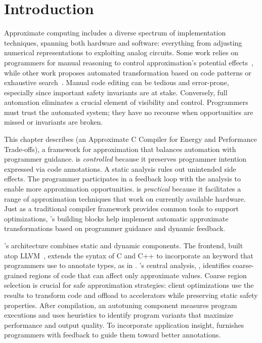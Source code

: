 \section{Introduction}\label{accept:sec:intro}

Approximate computing includes a diverse spectrum of
implementation techniques, spanning both hardware and software:
everything from adjusting numerical representations
to exploiting analog circuits.
Some work relies on programmers for manual reasoning to control
approximation's
potential effects~\cite{npu, flikker, races-ibm, perforation},
while other work proposes automated transformation based on code
patterns or exhaustive search~\cite{green, paraprox, sage}.
Manual code editing can be tedious and error-prone, especially since
important safety invariants are at stake.
Conversely, full automation eliminates a crucial element of
visibility and control.
Programmers must trust the automated system; they have no recourse when
opportunities are missed or invariants are broken.

This chapter describes \sysname
(an Approximate C Compiler for Energy and Performance Trade-offs),
a framework for approximation that balances automation with programmer
guidance.
\sysname is \emph{controlled} because it preserves programmer intention
expressed via code annotations.
A static analysis rules out
unintended side effects. The programmer participates in a feedback loop with
the analysis to enable more approximation
opportunities.
\sysname is \emph{practical} because it facilitates a range
of approximation techniques that work on currently available hardware.
Just as a traditional compiler framework provides common tools to support
optimizations,
\sysname's building blocks help implement automatic
approximate transformations based on programmer guidance and dynamic feedback.

\sysname's architecture combines static and dynamic components.
The frontend, built atop LLVM~\cite{llvm}, extends the syntax of C and C++ to
incorporate an  keyword that programmers use to annotate types, as
in .
\sysname's central analysis, \emph{\precisepurity}, identifies coarse-grained
regions of code that can
affect only approximate values.
Coarse region selection is crucial for safe approximation strategies:
client optimizations use the results to
transform code and offload to accelerators while preserving static safety
properties.
After compilation, an autotuning component measures program executions
and uses heuristics to identify program variants that maximize performance and output quality.
To incorporate application insight, \sysname furnishes programmers with feedback
to guide them toward better annotations.


